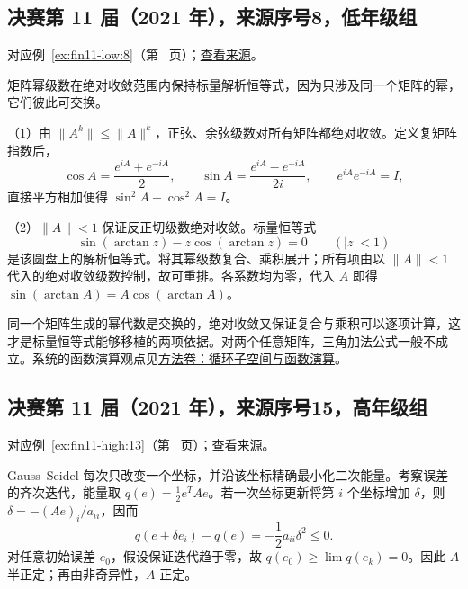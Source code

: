 \documentclass[12pt,fontset=fandol]{ctexart}
\begin{document}
\subsection{决赛第 11 届（2021 年），来源序号8，低年级组}\label{ans:fin11-low:8}\label{pr:fin11-low:8}

对应例~\ref{ex:fin11-low:8}（第~\pageref{ex:fin11-low:8} 页）；\href{https://github.com/lzxcr/cmc-mathematics/blob/64916fa1fdbc3e444a652eca204d5669058ee321/src/problems/finals/11/08.md}{查看来源}。

\begin{solve}

矩阵幂级数在绝对收敛范围内保持标量解析恒等式，因为只涉及同一个矩阵的幂，它们彼此可交换。

（1）由 $\|A^k\|\leq\|A\|^k$，正弦、余弦级数对所有矩阵都绝对收敛。定义复矩阵指数后，
\[
\cos A=\frac{e^{iA}+e^{-iA}}2,\qquad\sin A=\frac{e^{iA}-e^{-iA}}{2i},\qquad e^{iA}e^{-iA}=I,
\]
直接平方相加便得 $\sin^2A+\cos^2A=I$。

（2）$\|A\|<1$ 保证反正切级数绝对收敛。标量恒等式
\[
\sin(\arctan z)-z\cos(\arctan z)=0\qquad(|z|<1)
\]
是该圆盘上的解析恒等式。将其幂级数复合、乘积展开；所有项由以 $\|A\|<1$ 代入的绝对收敛级数控制，故可重排。各系数均为零，代入 $A$ 即得 $\sin(\arctan A)=A\cos(\arctan A)$。

\end{solve}

\begin{remark}[方法与条件]

同一个矩阵生成的幂代数是交换的，绝对收敛又保证复合与乘积可以逐项计算，这才是标量恒等式能够移植的两项依据。对两个任意矩阵，三角加法公式一般不成立。系统的函数演算观点见\hyperref[app:linear-cyclic]{方法卷：循环子空间与函数演算}。

\end{remark}

\subsection{决赛第 11 届（2021 年），来源序号15，高年级组}\label{ans:fin11-high:13}\label{pr:fin11-high:13}

对应例~\ref{ex:fin11-high:13}（第~\pageref{ex:fin11-high:13} 页）；\href{https://github.com/lzxcr/cmc-mathematics/blob/64916fa1fdbc3e444a652eca204d5669058ee321/src/problems/finals/11/15.md}{查看来源}。

\begin{solve}

Gauss--Seidel 每次只改变一个坐标，并沿该坐标精确最小化二次能量。考察误差的齐次迭代，能量取 $q(e)=\frac12e^TAe$。若一次坐标更新将第 $i$ 个坐标增加 $\delta$，则 $\delta=-(Ae)_i/a_{ii}$，因而
\[
q(e+\delta e_i)-q(e)=-\frac12a_{ii}\delta^2\leq0.
\]
对任意初始误差 $e_0$，假设保证迭代趋于零，故 $q(e_0)\geq\lim q(e_k)=0$。因此 $A$ 半正定；再由非奇异性，$A$ 正定。

\end{solve}
\end{document}
